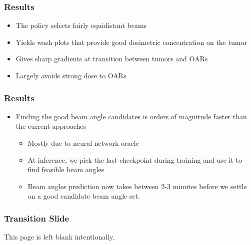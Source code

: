 \begin{frame}
	\frametitle{Results}
	\begin{itemize}
		\item The policy selects fairly equidistant beams
		\item Yields wash plots that provide good dosimetric concentration on the tumor
		\item Gives sharp gradients at transition between tumors and OARs
		\item Largely avoids strong dose to OARs
	\end{itemize}
\end{frame}

\begin{frame}
\frametitle{Results}
\begin{itemize}
	\item Finding the good beam angle candidates is orders of magnitude faster than the current approaches
	\vspace{0.3cm}
	\begin{itemize}
		\item Mostly due to neural network oracle
		\vspace{0.3cm}
		\item At inference, we pick the last checkpoint  during training and use it to find feasible beam angles
		\vspace{0.3cm}
		\item Beam angles prediction now takes between 2-3 minutes before we settle on a good candidate beam angle set. 
	\end{itemize}
\end{itemize}
\end{frame}


\begin{frame}
\frametitle{Transition Slide}
\centering This page is left blank intentionally.
\end{frame}